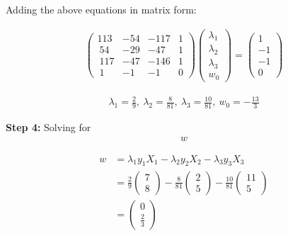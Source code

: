 \documentclass[12pt]{report}
\begin{document}
Adding the above equations in matrix form:

\begin{equation*}
	\begin{aligned}
		\begin{pmatrix}113 & -54 & -117 & 1 \\ \:54&-29&-47&1\\ \:117&-47&-146&1\\ \:1&-1&-1&0\end{pmatrix}\begin{pmatrix}\lambda_{1}\\ \lambda_{2}\\ \lambda_{3}\\ w_{0}\end{pmatrix}=\begin{pmatrix}1\\ -1\\ -1\\ 0\end{pmatrix}
	\end{aligned}
\end{equation*}

\begin{equation*}
	\begin{aligned}
		\lambda_{1}=\frac{2}{9},\:\lambda_{2}=\frac{8}{81},\:\lambda_{3}=\frac{10}{81},\:w_{0}=-\frac{13}{3}
	\end{aligned}
\end{equation*}

\vspace{20pt}
\textbf{Step 4:} Solving for \begin{equation*}
	\begin{aligned}w
	\end{aligned}
\end{equation*}

\begin{equation}
	\begin{aligned}
		w & = \lambda_{1}y_{1}X_{1} - \lambda_{2}y_{2}X_{2} - \lambda_{3}y_{3}X_{3}                                                                                                                 \\
		  & = \frac{2}{9}\begin{pmatrix}7                                           \\ 8\end{pmatrix}-\frac{8}{81}\begin{pmatrix}2\\ 5\end{pmatrix}-\frac{10}{81}\begin{pmatrix}11\\ 5\end{pmatrix} \\
		  & = \begin{pmatrix}0                                                      \\ \frac{2}{3}\end{pmatrix}
	\end{aligned}
\end{equation}
\end{document}
